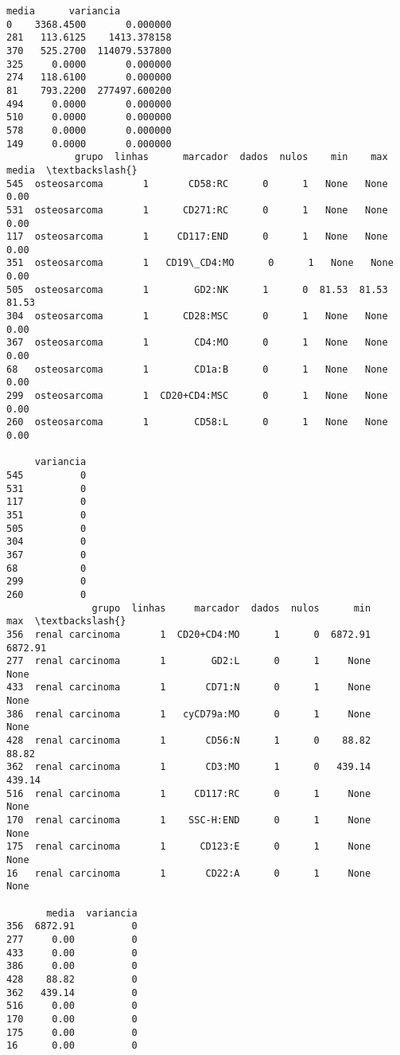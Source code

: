 \documentclass[11pt]{article}
\begin{document}
\begin{Verbatim}[commandchars=\\\{\}]
         media      variancia  
0    3368.4500       0.000000  
281   113.6125    1413.378158  
370   525.2700  114079.537800  
325     0.0000       0.000000  
274   118.6100       0.000000  
81    793.2200  277497.600200  
494     0.0000       0.000000  
510     0.0000       0.000000  
578     0.0000       0.000000  
149     0.0000       0.000000  
            grupo  linhas      marcador  dados  nulos    min    max  media  \textbackslash{}
545  osteosarcoma       1       CD58:RC      0      1   None   None   0.00   
531  osteosarcoma       1      CD271:RC      0      1   None   None   0.00   
117  osteosarcoma       1     CD117:END      0      1   None   None   0.00   
351  osteosarcoma       1   CD19\_CD4:MO      0      1   None   None   0.00   
505  osteosarcoma       1        GD2:NK      1      0  81.53  81.53  81.53   
304  osteosarcoma       1      CD28:MSC      0      1   None   None   0.00   
367  osteosarcoma       1        CD4:MO      0      1   None   None   0.00   
68   osteosarcoma       1        CD1a:B      0      1   None   None   0.00   
299  osteosarcoma       1  CD20+CD4:MSC      0      1   None   None   0.00   
260  osteosarcoma       1        CD58:L      0      1   None   None   0.00   

     variancia  
545          0  
531          0  
117          0  
351          0  
505          0  
304          0  
367          0  
68           0  
299          0  
260          0  
               grupo  linhas     marcador  dados  nulos      min      max  \textbackslash{}
356  renal carcinoma       1  CD20+CD4:MO      1      0  6872.91  6872.91   
277  renal carcinoma       1        GD2:L      0      1     None     None   
433  renal carcinoma       1       CD71:N      0      1     None     None   
386  renal carcinoma       1   cyCD79a:MO      0      1     None     None   
428  renal carcinoma       1       CD56:N      1      0    88.82    88.82   
362  renal carcinoma       1       CD3:MO      1      0   439.14   439.14   
516  renal carcinoma       1     CD117:RC      0      1     None     None   
170  renal carcinoma       1    SSC-H:END      0      1     None     None   
175  renal carcinoma       1      CD123:E      0      1     None     None   
16   renal carcinoma       1       CD22:A      0      1     None     None   

       media  variancia  
356  6872.91          0  
277     0.00          0  
433     0.00          0  
386     0.00          0  
428    88.82          0  
362   439.14          0  
516     0.00          0  
170     0.00          0  
175     0.00          0  
16      0.00          0  

    \end{Verbatim}
\end{document}

